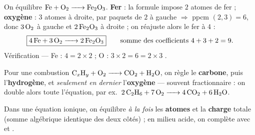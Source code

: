 \documentclass[11pt,a4paper]{article}
\begin{document}
\begin{exemplebox}
On équilibre $\ce{Fe + O2 -> Fe2O3}$. \textbf{Fer} : la formule  impose $2$ atomes de fer ;
\textbf{oxygène} : $3$ atomes à droite, par paquets de $2$ à gauche $\Rightarrow$ ppcm $(2,3)=6$, donc
$3\,\ce{O2}$ à gauche et $2\,\ce{Fe2O3}$ à droite ; on réajuste alors le fer à $4$ :
\[
\boxed{\ce{4 Fe + 3 O2 -> 2 Fe2O3}}\qquad
\text{somme des coefficients } 4+3+2=9.
\]
Vérification — Fe : $4=2\times2$ \checkmark ; O : $3\times2=6=2\times3$ \checkmark.
\end{exemplebox}

\begin{remarque}
Pour une combustion $\ce{C_xH_y + O2 -> CO2 + H2O}$, on règle le \textbf{carbone}, puis
l'\textbf{hydrogène}, et \emph{seulement en dernier} l'\textbf{oxygène} — souvent fractionnaire :
on double alors toute l'équation, par ex.\ $\ce{2 C2H6 + 7 O2 -> 4 CO2 + 6 H2O}$.
\end{remarque}

\begin{cle}
Dans une équation ionique, on équilibre \emph{à la fois} les \textbf{atomes} et la \textbf{charge}
totale (somme algébrique identique des deux côtés) ; en milieu acide, on complète avec  et
.
\end{cle}
\end{document}
